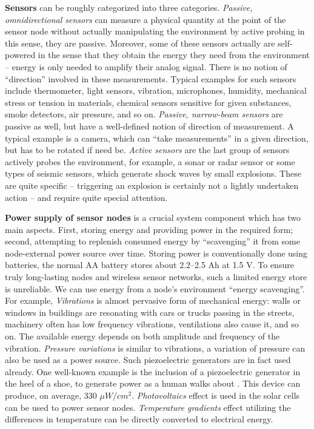 	\textbf{Sensors} can be roughly categorized into three categories.
		\textit{Passive, omnidirectional sensors} can measure a physical quantity at the point of the sensor node without actually manipulating the environment by active probing in this sense, they are passive. 
		Moreover, some of these sensors actually are self-powered in the sense that they obtain the energy they need from the environment – energy is only needed to amplify their analog signal. 
		There is no notion of ``direction'' involved in these measurements.
		Typical examples for such sensors include thermometer, light sensors, vibration, microphones, humidity, mechanical stress or tension in materials, chemical sensors sensitive for given substances, smoke detectors, air pressure, and so on.
		\textit{Passive, narrow-beam sensors} are passive as well, but have a well-defined notion of direction of measurement. 
		A typical example is a camera, which can ``take measurements'' in a given direction, but has to be rotated if need be.
		\textit{Active sensors} are the last group of sensors actively probes the environment, for example, a sonar or radar sensor or some types of seismic sensors, which generate shock waves by small explosions.
		These are quite specific – triggering an explosion is certainly not a lightly undertaken action – and require quite special attention.

	\textbf{Power supply of sensor nodes} is a crucial system component which has two main aspects.
		First, storing energy and providing power in the required form; second, attempting to replenish consumed energy by ``scavenging'' it from some node-external power source over time.
		Storing power is conventionally done using batteries, the normal AA battery stores about 2.2–2.5 Ah at 1.5 V.
		To ensure truly long-lasting nodes and wireless sensor networks, such a limited energy store is unreliable. 
		We can use energy from a node’s environment ``energy scavenging''.
		For example, \textit{Vibrations} is almost pervasive form of mechanical energy: walls or windows in buildings are resonating with cars or trucks passing in the streets, machinery often has low frequency vibrations, ventilations also cause it, and so on.
		The available energy depends on both amplitude and frequency of the vibration.
		\textit{Pressure variations} is similar to vibrations, a variation of pressure can also be used as a power source. 
		Such piezoelectric generators are in fact used already. 
		One well-known example is the inclusion of a piezoelectric generator in the heel of a shoe, to generate power as a human walks about \cite{shenck2001energy}. 
		This device can produce, on average, 330 $\mu W / cm^{2}$. 
		\textit{Photovoltaics} effect is used in the solar cells can be used to power sensor nodes.
		\textit{Temperature gradients} effect utilizing the differences in temperature can be directly converted to electrical energy.

